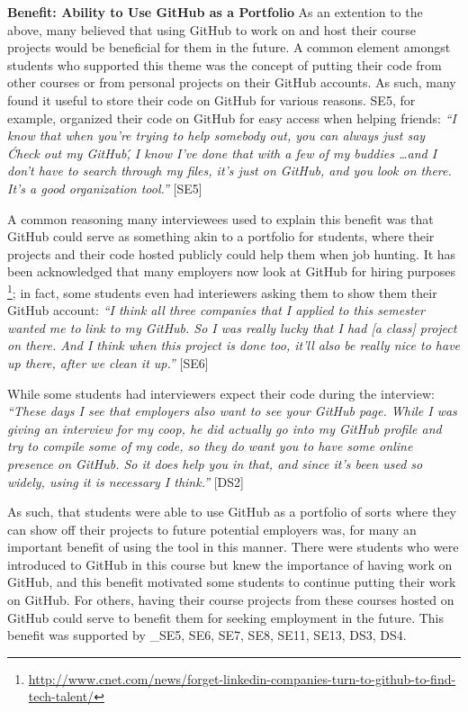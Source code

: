 \textbf{Benefit: Ability to Use GitHub as a Portfolio}
As an extention to the above, many believed that using GitHub to work on and host their course projects would be beneficial for them in the future. A common element amongst students who supported this theme was the concept of putting their code from other courses or from personal projects on their GitHub accounts. As such, many found it useful to store their code on GitHub for various reasons. SE5, for example, organized their code on GitHub for easy access when helping friends: \textit{``I know that when you're trying to help somebody out, you can always just say \'Check out my GitHub\', I know I've done that with a few of my buddies \ldots and I don't have to search through my files, it's just on GitHub, and you look on there. It's a good organization tool.''} [SE5]

A common reasoning many interviewees used to explain this benefit was that GitHub could serve as something akin to a portfolio for students, where their projects and their code hosted publicly could help them when job hunting. It has been acknowledged that many employers now look at GitHub for hiring purposes \footnote{\url{http://www.cnet.com/news/forget-linkedin-companies-turn-to-github-to-find-tech-talent/}}; in fact, some students even had interiewers asking them to show them their GitHub account: \textit{``I think all three companies that I applied to this semester wanted me to link to my GitHub. So I was really lucky that I had [a class] project on there. And I think when this project is done too, it'll also be really nice to have up there, after we clean it up.''} [SE6]

While some students had interviewers expect their code during the interview: \textit{``These days I see that employers also want to see your GitHub page. While I was giving an interview for my coop, he did actually go into my GitHub profile and try to compile some of my code, so they do want you to have some online presence on GitHub. So it does help you in that, and since it's been used so widely, using it is necessary I think.''} [DS2]


As such, that students were able to use GitHub as a portfolio of sorts where they can show off their projects to future potential employers was, for many an important benefit of using the tool in this manner. There were students who were introduced to GitHub in this course but knew the importance of having work on GitHub, and this benefit motivated some students to continue putting their work on GitHub. For others, having their course projects from these courses hosted on GitHub could serve to benefit them for seeking employment in the future. This benefit was supported by _{SE5, SE6, SE7, SE8, SE11, SE13, DS3, DS4}.

